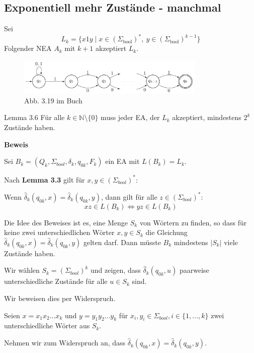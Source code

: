 \documentclass[a4paper, 11pt]{article}
\def\N{\mathbb{N}}
\begin{document}
        \subsection{Exponentiell mehr Zustände - manchmal}
        Sei 
        $$L_k = \{x1y \mid x \in (\Sigma_{\text{bool}})^*, \ y \in (\Sigma_{\text{bool}})^{k-1}\}$$
        Folgender NEA $A_k$ mit $k+1$ akzeptiert $L_k$.
        \begin{figure}
            \includegraphics[width=0.8\textwidth]{Images/NEA_A_k.png}
            \caption{Abb. 3.19 im Buch}
        \end{figure}
    
        \begin{mainbox}{Lemma 3.6}
            Für alle $k \in \N \setminus \{0\}$ muss jeder EA, der $L_k$ akzeptiert, mindestens $2^k$ Zustände haben.
        \end{mainbox}
        \textbf{Beweis}
    
        Sei $B_k = (Q_k, \Sigma_{bool}, \delta_k, q_{0k}, F_k)$ ein EA mit $L(B_k) = L_k$. 
        
        Nach \textbf{Lemma 3.3} gilt für $x,y \in (\Sigma_{bool})^*$:
    
        Wenn $\hat{\delta}_k (q_{0k}, x) = \hat{\delta}_k (q_{0k}, y)$, dann gilt für alle $z \in (\Sigma_{bool})^*$:
        $$xz \in L(B_k) \iff yz \in L(B_k)$$
    
        Die Idee des Beweises ist es, eine Menge $S_k$ von Wörtern zu finden, so dass für keine zwei unterschiedlichen Wörter $x, y \in S_k$ die Gleichung $\hat{\delta}_k (q_{0k}, x) = \hat{\delta}_k (q_{0k}, y)$ gelten darf. 
        Dann müsste $B_k$ mindestens $|S_k|$ viele Zustände haben.
        
    
        Wir wählen $S_k = (\Sigma_{bool})^k$ und zeigen, dass $\hat{\delta}_k(q_{0k}, u)$ paarweise unterschiedliche Zustände für alle $u \in  S_k$ sind. 
    
        Wir beweisen dies per Widerspruch. 
    
        Seien $x = x_1x_2...x_k$ und $y = y_1y_2...y_k$ für $x_i,y_i \in \Sigma_{bool}, i \in \{1, ..., k\}$ zwei unterschiedliche Wörter aus $S_k$.
    
        Nehmen wir zum Widerspruch an, dass $\hat{\delta}_k(q_{0k}, x) = \hat{\delta}_k(q_{0k}, y)$.
        
\end{document}
